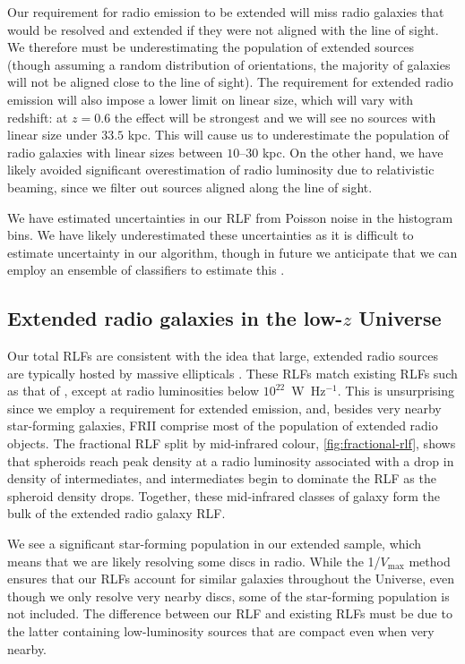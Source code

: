 \documentclass[11pt, a4paper]{book}
\begin{document}
    Our requirement for radio emission to be extended will miss radio galaxies that would be resolved and extended if they were not aligned with the line of sight. We therefore must be underestimating the population of extended sources (though assuming a random distribution of orientations, the majority of galaxies will not be aligned close to the line of sight). The requirement for extended radio emission will also impose a lower limit on linear size, which will vary with redshift: at $z = 0.6$ the effect will be strongest and we will see no sources with linear size under $33.5$ kpc. This will cause us to underestimate the population of radio galaxies with linear sizes between $10$--$30$ kpc. On the other hand, we have likely avoided significant overestimation of radio luminosity due to relativistic beaming, since we filter out sources aligned along the line of sight.

    We have estimated uncertainties in our RLF from Poisson noise in the histogram bins. We
    have likely underestimated these uncertainties as it is difficult to
    estimate uncertainty in our algorithm, though in future we anticipate that we can
    employ an ensemble of classifiers to estimate this \citep[e.g.][]{lakshminarayanan17uncertainty}.

  \subsection{Extended radio galaxies in the low-$z$ Universe}

      Our total RLFs are consistent with the idea that large, extended radio sources are typically hosted by massive ellipticals \citep{best05agn}. These RLFs match existing RLFs such as that of \citet{mauch07rlf}, except at radio luminosities below $10^{22}$~W~Hz$^{-1}$. This is unsurprising since we employ a requirement for extended emission, and, besides very nearby star-forming galaxies, FRII comprise most of the population of extended radio objects. The fractional RLF split by mid-infrared colour, \autoref{fig:fractional-rlf}, shows that spheroids reach peak density at a radio luminosity associated with a drop in density of intermediates, and intermediates begin to dominate the RLF as the spheroid density drops. Together, these mid-infrared classes of galaxy form the bulk of the extended radio galaxy RLF.

      We see a significant star-forming population in our extended sample, which means that we are likely resolving some discs in radio. While the 1/$V_{\max}$ method ensures that our RLFs account for similar galaxies throughout the Universe, even though we only resolve very nearby discs, some of the star-forming population is not included. The difference between our RLF and existing RLFs must be due to the latter containing low-luminosity sources that are compact even when very nearby.
\end{document}

